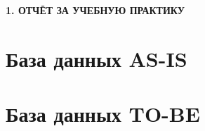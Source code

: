 \newpage
\begin{center}
  \textbf{\large 1. ОТЧЁТ ЗА УЧЕБНУЮ ПРАКТИКУ}
\end{center}


\section{База данных AS-IS}



\section{База данных TO-BE}


